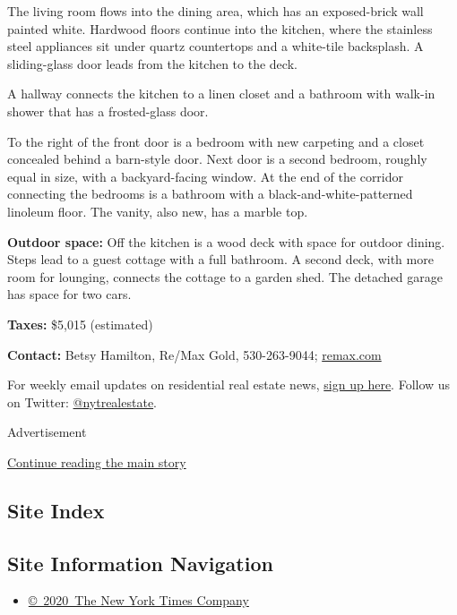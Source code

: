 The living room flows into the dining area, which has an exposed-brick
wall painted white. Hardwood floors continue into the kitchen, where the
stainless steel appliances sit under quartz countertops and a white-tile
backsplash. A sliding-glass door leads from the kitchen to the deck.

A hallway connects the kitchen to a linen closet and a bathroom with
walk-in shower that has a frosted-glass door.

To the right of the front door is a bedroom with new carpeting and a
closet concealed behind a barn-style door. Next door is a second
bedroom, roughly equal in size, with a backyard-facing window. At the
end of the corridor connecting the bedrooms is a bathroom with a
black-and-white-patterned linoleum floor. The vanity, also new, has a
marble top.

\textbf{Outdoor space:} Off the kitchen is a wood deck with space for
outdoor dining. Steps lead to a guest cottage with a full bathroom. A
second deck, with more room for lounging, connects the cottage to a
garden shed. The detached garage has space for two cars.

\textbf{Taxes:} \$5,015 (estimated)

\textbf{Contact:} Betsy Hamilton, Re/Max Gold, 530-263-9044;
\href{https://www.remax.com/ca/grass-valley/home-details/11485-squirrel-creek-rd-grass-valley-ca-95945/8538207316524507365/M00000091/20049145}{remax.com}

For weekly email updates on residential real estate news,
\href{http://www.nytimes3xbfgragh.onion/newsletters/realestate/}{sign up
here}. Follow us on Twitter:
\href{https://twitter.com/nytrealestate}{@nytrealestate}.

Advertisement

\protect\hyperlink{after-bottom}{Continue reading the main story}

\hypertarget{site-index}{%
\subsection{Site Index}\label{site-index}}

\hypertarget{site-information-navigation}{%
\subsection{Site Information
Navigation}\label{site-information-navigation}}

\begin{itemize}
\tightlist
\item
  \href{https://help.nytimes3xbfgragh.onion/hc/en-us/articles/115014792127-Copyright-notice}{©~2020~The
  New York Times Company}
\end{itemize}

